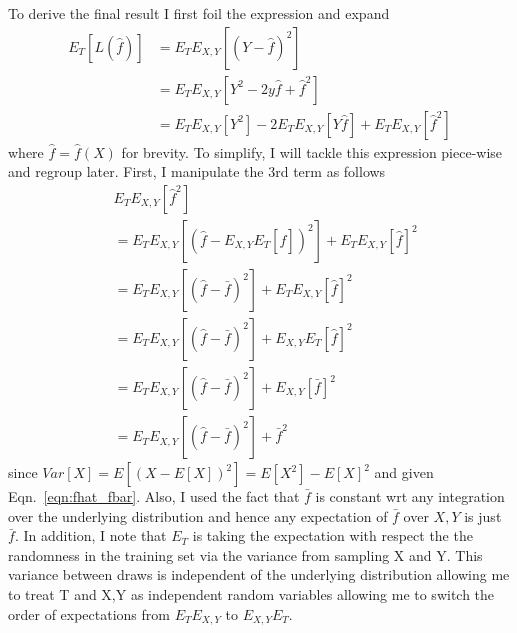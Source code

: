 \documentclass[12pt]{amsart}
\begin{document}
To derive the final result I first foil the expression and expand
\begin{equation} \label{eqn:et_lf_0}
\begin{split}
E_T[L(\hat{f})] & = E_TE_{X,Y}[(Y - \hat{f})^2] \\
& = E_TE_{X,Y}[Y^2 - 2y\hat{f} + \hat{f}^2] \\
& = E_TE_{X,Y}[Y^2] - 2E_TE_{X,Y}[Y\hat{f}] + E_TE_{X,Y}[\hat{f}^2]
\end{split}
\end{equation}
where $\hat{f} = \hat{f}(X)$ for brevity.  To simplify, I will tackle this expression piece-wise and regroup later.  First, I manipulate the 3rd term as follows
\begin{equation} \label{eqn:fhat_var}
\begin{split}
& E_TE_{X,Y}[\hat{f}^2] \\
& = E_TE_{X,Y}[(\hat{f} - E_{X,Y}E_T[\hat{f}])^2] + E_TE_{X,Y}[\hat{f}]^2 \\
& = E_TE_{X,Y}[(\hat{f} - \bar{f})^2] + E_TE_{X,Y}[\hat{f}]^2 \\
& = E_TE_{X,Y}[(\hat{f} - \bar{f})^2] + E_{X,Y}E_T[\hat{f}]^2 \\
& = E_TE_{X,Y}[(\hat{f} - \bar{f})^2] + E_{X,Y}[\bar{f}]^2 \\
& = E_TE_{X,Y}[(\hat{f} - \bar{f})^2] + \bar{f}^2
\end{split}
\end{equation}
since $Var[X] = E[(X - E[X])^2] = E[X^2] - E[X]^2$ and given Eqn.~\ref{eqn:fhat_fbar}.  Also, I used the fact that $\bar{f}$ is constant wrt any integration over the underlying distribution and hence any expectation of $\bar{f}$ over $X,Y$ is just $\bar{f}$.  In addition, I note that $E_T$ is taking the expectation with respect the the randomness in the training set via the variance from sampling X and Y. This variance between draws is independent of the underlying distribution allowing me to treat T and X,Y as independent random variables allowing me to switch the order of expectations from $E_T E_{X,Y}$ to $E_{X,Y}E_T$.
\end{document}
